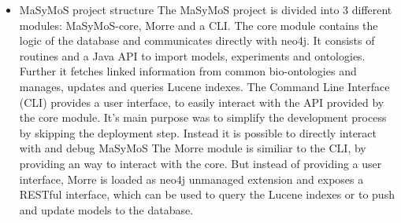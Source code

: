 \begin{itemize}
	\item MaSyMoS project structure
		\subitem The MaSyMoS project is divided into 3 different modules: MaSyMoS-core, Morre and a CLI.
		\subitem The core module contains the logic of the database and communicates directly with neo4j. It consists of routines and a Java API to import models, experiments and ontologies. Further it fetches linked information from common bio-ontologies and manages, updates and queries Lucene indexes.
		\subitem The Command Line Interface (CLI) provides a user interface, to easily interact with the API provided by the core module. It's main purpose was to simplify the development process by skipping the deployment step. Instead it is possible to directly interact with and debug MaSyMoS
		\subitem The Morre module is similiar to the CLI, by providing an way to interact with the core. But instead of providing a user interface, Morre is loaded as neo4j unmanaged extension and exposes a RESTful interface, which can be used to query the Lucene indexes or to push and update models to the database.
	\end{itemize}
	
